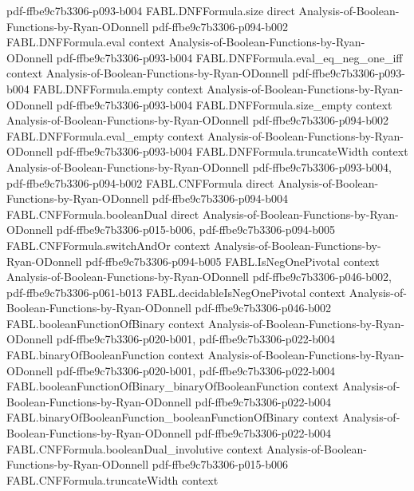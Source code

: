\begin{theorem}
  {pdf-ffbe9c7b3306-p093-b004}
\proofstep
  {FABL.DNFFormula.size}
  {direct}
  {Analysis-of-Boolean-Functions-by-Ryan-ODonnell}
  {pdf-ffbe9c7b3306-p094-b002}
\proofstep
  {FABL.DNFFormula.eval}
  {context}
  {Analysis-of-Boolean-Functions-by-Ryan-ODonnell}
  {pdf-ffbe9c7b3306-p093-b004}
\proofstep
  {FABL.DNFFormula.eval_eq_neg_one_iff}
  {context}
  {Analysis-of-Boolean-Functions-by-Ryan-ODonnell}
  {pdf-ffbe9c7b3306-p093-b004}
\proofstep
  {FABL.DNFFormula.empty}
  {context}
  {Analysis-of-Boolean-Functions-by-Ryan-ODonnell}
  {pdf-ffbe9c7b3306-p093-b004}
\proofstep
  {FABL.DNFFormula.size_empty}
  {context}
  {Analysis-of-Boolean-Functions-by-Ryan-ODonnell}
  {pdf-ffbe9c7b3306-p094-b002}
\proofstep
  {FABL.DNFFormula.eval_empty}
  {context}
  {Analysis-of-Boolean-Functions-by-Ryan-ODonnell}
  {pdf-ffbe9c7b3306-p093-b004}
\proofstep
  {FABL.DNFFormula.truncateWidth}
  {context}
  {Analysis-of-Boolean-Functions-by-Ryan-ODonnell}
  {pdf-ffbe9c7b3306-p093-b004,
    pdf-ffbe9c7b3306-p094-b002}
\proofstep
  {FABL.CNFFormula}
  {direct}
  {Analysis-of-Boolean-Functions-by-Ryan-ODonnell}
  {pdf-ffbe9c7b3306-p094-b004}
\proofstep
  {FABL.CNFFormula.booleanDual}
  {direct}
  {Analysis-of-Boolean-Functions-by-Ryan-ODonnell}
  {pdf-ffbe9c7b3306-p015-b006,
    pdf-ffbe9c7b3306-p094-b005}
\proofstep
  {FABL.CNFFormula.switchAndOr}
  {context}
  {Analysis-of-Boolean-Functions-by-Ryan-ODonnell}
  {pdf-ffbe9c7b3306-p094-b005}
\proofstep
  {FABL.IsNegOnePivotal}
  {context}
  {Analysis-of-Boolean-Functions-by-Ryan-ODonnell}
  {pdf-ffbe9c7b3306-p046-b002,
    pdf-ffbe9c7b3306-p061-b013}
\proofstep
  {FABL.decidableIsNegOnePivotal}
  {context}
  {Analysis-of-Boolean-Functions-by-Ryan-ODonnell}
  {pdf-ffbe9c7b3306-p046-b002}
\proofstep
  {FABL.booleanFunctionOfBinary}
  {context}
  {Analysis-of-Boolean-Functions-by-Ryan-ODonnell}
  {pdf-ffbe9c7b3306-p020-b001,
    pdf-ffbe9c7b3306-p022-b004}
\proofstep
  {FABL.binaryOfBooleanFunction}
  {context}
  {Analysis-of-Boolean-Functions-by-Ryan-ODonnell}
  {pdf-ffbe9c7b3306-p020-b001,
    pdf-ffbe9c7b3306-p022-b004}
\proofstep
  {FABL.booleanFunctionOfBinary_binaryOfBooleanFunction}
  {context}
  {Analysis-of-Boolean-Functions-by-Ryan-ODonnell}
  {pdf-ffbe9c7b3306-p022-b004}
\proofstep
  {FABL.binaryOfBooleanFunction_booleanFunctionOfBinary}
  {context}
  {Analysis-of-Boolean-Functions-by-Ryan-ODonnell}
  {pdf-ffbe9c7b3306-p022-b004}
\proofstep
  {FABL.CNFFormula.booleanDual_involutive}
  {context}
  {Analysis-of-Boolean-Functions-by-Ryan-ODonnell}
  {pdf-ffbe9c7b3306-p015-b006}
\proofstep
  {FABL.CNFFormula.truncateWidth}
  {context}

\end{theorem}

